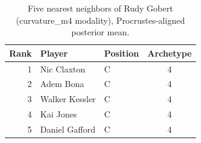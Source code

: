 \begin{table}[htbp]
  \centering\small
  \begin{tabular}{rllc}
    \toprule
    Rank & Player & Position & Archetype \\
    \midrule
    1 & Nic Claxton & C & 4 \\
    2 & Adem Bona & C & 4 \\
    3 & Walker Kessler & C & 4 \\
    4 & Kai Jones & C & 4 \\
    5 & Daniel Gafford & C & 4 \\
    \bottomrule
  \end{tabular}
  \caption{Five nearest neighbors of Rudy Gobert (curvature_m4 modality), Procrustes-aligned posterior mean.}
  \label{tab:Rudy_Gobert_neighbors_curvature_m4}
\end{table}

